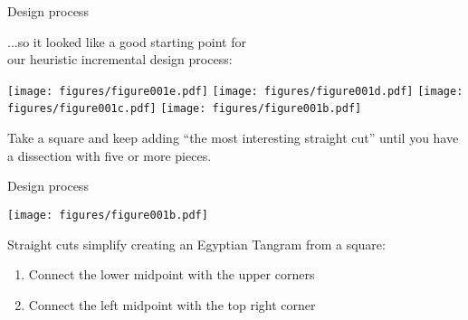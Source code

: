 \documentclass[14pt]{beamer}
\begin{document}
    \begin{frame}{Design process}
        \begin{center}
            ...so it looked like a good starting point for\\our heuristic incremental design process:

            \bigskip\bigskip

            \texttt{[image: figures/figure001e.pdf]} \quad \texttt{[image: figures/figure001d.pdf]} \quad \texttt{[image: figures/figure001c.pdf]} \quad \texttt{[image: figures/figure001b.pdf]} \\

            \bigskip\bigskip

            {\small Take a square and keep adding ``the most interesting straight cut'' until you have a dissection with five or more pieces.}
        \end{center}
    \end{frame}


    \begin{frame}{Design process}
        \begin{center}
            \texttt{[image: figures/figure001b.pdf]}
        \end{center}

        {\small Straight cuts simplify creating an Egyptian Tangram from a square:}

        {\small \begin{enumerate}
            \item Connect the lower midpoint with the upper corners
            \item Connect the left midpoint with the top right corner
        \end{enumerate}}
    \end{frame}

\end{document}
